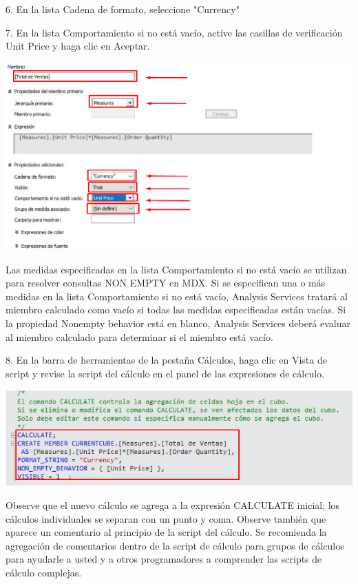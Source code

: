 6. En la lista Cadena de formato, seleccione "Currency"

7. En la lista Comportamiento si no está vacío, active las casillas de verificación Unit Price y haga clic en Aceptar.

	\begin{center}
	\includegraphics[width=\columnwidth]{images/task7/img6}
	\end{center}	

Las medidas especificadas en la lista Comportamiento si no está vacío se utilizan para resolver consultas NON
EMPTY en MDX. Si se especifican una o más medidas en la lista Comportamiento si no está vacío, Analysis Services
tratará al miembro calculado como vacío si todas las medidas especificadas están vacías. Si la propiedad Nonempty behavior está en blanco, Analysis Services deberá evaluar al miembro calculado para determinar si el
miembro está vacío.

8. En la barra de herramientas de la pestaña Cálculos, haga clic en Vista de script y revise la script del cálculo
en el panel de las expresiones de cálculo.

	\begin{center}
	\includegraphics[width=\columnwidth]{images/task7/img7}
	\end{center}	

Observe que el nuevo cálculo se agrega a la expresión CALCULATE inicial; los cálculos individuales se separan con
un punto y coma. Observe también que aparece un comentario al principio de la script del cálculo. Se recomienda
la agregación de comentarios dentro de la script de cálculo para grupos de cálculos para ayudarle a usted y a otros
programadores a comprender las scripts de cálculo complejas.

